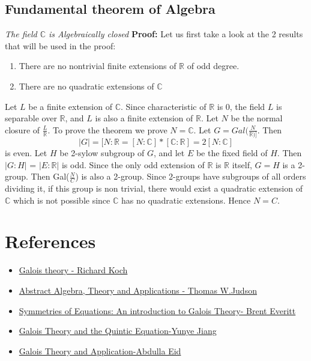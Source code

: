 \documentclass[a4paper, 10pt]{article}
\providecommand{\abs}[1]{\lvert#1\rvert}
\theoremstyle{plain}
\theoremstyle{definition}
\theoremstyle{remark}
\begin{document}
 \subsection{Fundamental theorem of Algebra}
 {\it The field $\mathbb C$ is Algebraically closed} \newline
 {\bf Proof:} \newline
 Let us first take a look at the 2 results that will be used in the proof: 
 \begin{enumerate}
     \item There are no nontrivial finite extensions of $\mathbb R$ of odd degree.
     \item There are no quadratic extensions of $\mathbb{C}$ 
    
 \end{enumerate}
 Let $L$ be a finite extension of $\mathbb{C}$. Since characteristic of $\mathbb{R}$ is 0, the field $L$ is separable over $\mathbb{R}$, and $L$ is also a finite extension of $\mathbb R$. Let $N$ be the normal closure of $\frac{L}{\mathbb R}$. To prove the theorem we prove  $N = \mathbb C$. Let $G = Gal(\frac{N}{\mathbb R)]}$. Then $$\abs{G} = [N : \mathbb{R} = [N : \mathbb{C}] * [\mathbb{C} : \mathbb{R}] = 2[N : \mathbb{C}]$$ is even. Let $H$ be 2-sylow subgroup of $G$, and let $E$ be the fixed field of $H$. Then $\abs{G : H}$ = $\abs{E : \mathbb{R}}$ is odd. Since the only odd extension of $\mathbb R$ is $\mathbb R$ itself, $G = H$ is a 2-group. Then Gal($\frac{N}{C}$) is also a 2-group. Since 2-groups have subgroups of all orders dividing it, if this group is non trivial, there would exist a quadratic extension of $\mathbb C$ which is not possible since $\mathbb C$ has no quadratic extensions. Hence $N = C$.

 \section{References}
     \begin{itemize}
     	\item \href{https://pages.uoregon.edu/koch/Galois.pdf}{Galois theory - Richard Koch}
     	
     	\item \href{http://abstract.ups.edu/download/aata-20100827.pdf}{Abstract Algebra, Theory and Applications - Thomas W.Judson }
     	\item \href{http://www-users.york.ac.uk/~bje1/galnotes.pdf}{Symmetries of Equations: An introduction to Galois Theory- Brent Everitt}
\item \href{https://digitalworks.union.edu/cgi/viewcontent.cgi?article=2207&context=theses}{Galois Theory and the Quintic Equation-Yunye Jiang
}
\item \href{https://faculty.math.illinois.edu/~eid1/sp.pdf}{Galois Theory and Application-Abdulla Eid}
	
     \end{itemize}
\end{document}
